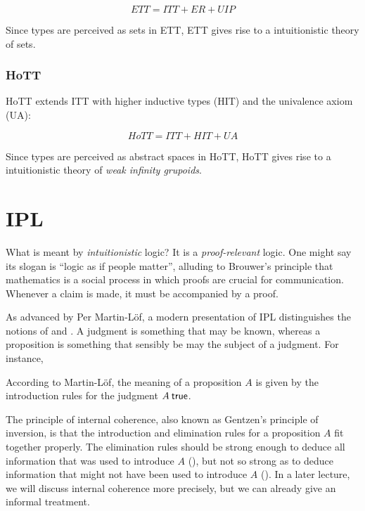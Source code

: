 \documentclass[12pt]{article}
\begin{document}
\begin{equation*}
ETT = ITT + ER + UIP
\end{equation*}

\noindent Since types are perceived as sets in \acs{ETT}, \acs{ETT} gives rise to a
intuitionistic theory of sets.

\subsubsection{\Acl{HoTT}}

\Acs{HoTT} extends \acs{ITT} with higher inductive types (HIT) and the univalence axiom (UA):


\begin{equation*}
HoTT = ITT + HIT + UA
\end{equation*}

\noindent Since types are perceived as abstract spaces in \acs{HoTT}, \acs{HoTT} gives rise to
a intuitionistic theory of \emph{weak infinity grupoids}.

\section{\Acl{IPL}}\label{sec:ipl}

What is meant by \emph{intuitionistic} logic?  It is a \emph{proof-relevant} logic.  One might say its slogan is ``logic as if people matter'', alluding to Brouwer's principle that mathematics is a social process in which proofs are crucial for communication.  Whenever a claim is made, it must be accompanied by a proof.

As advanced by Per Martin-L\"{o}f, a modern presentation of \acf{IPL} distinguishes the notions of  and .
A judgment is something that may be known, whereas a proposition is something that sensibly be may the subject of a judgment.
For instance, 

According to Martin-L\"{o}f, the meaning of a proposition $A$ is given by the introduction rules for the judgment $A \true$.

The principle of internal coherence, also known as Gentzen's principle of inversion, is that the introduction and elimination rules for a proposition $A$ fit together properly.  The elimination rules should be strong enough to deduce all information that was used to introduce $A$ (), but not so strong as to deduce information that might not have been used to introduce $A$ ().  In a later lecture, we will discuss internal coherence more precisely, but we can already give an informal treatment.
\end{document}
